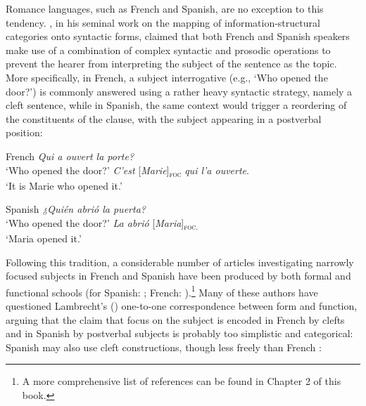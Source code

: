 Romance languages, such as French and Spanish, are no exception to this tendency. \textcite{lambrecht1996information}, in his seminal work on the mapping of information-structural categories onto syntactic forms, claimed that both French and Spanish speakers make use of a combination of complex syntactic and prosodic operations to prevent the hearer from interpreting the subject of the sentence as the topic. More specifically, in French, a subject interrogative (e.g., `Who opened the door?') is commonly answered using a rather heavy syntactic strategy, namely a cleft sentence, while in Spanish, the same context would trigger a reordering of the constituents of the clause, with the subject appearing in a postverbal position:

 \ea \label{ex:intro:2}  {French}
\ea \textit{Qui a ouvert la porte?}\\
 ‘Who opened the door?'
\ex \textit{C'est}  {[\textit{Marie}}]\textsubscript{\textsc{foc}} \normalsize  \textit{qui l'a ouverte}.\\
`It is Marie who opened it.'

\z \z 

 \ea \label{ex:intro:3} {Spanish}
\ea \textit{¿Quién abrió la puerta?}\\
 ‘Who opened the door?'
\ex \textit{La abrió} {[\textit{Maria}]\textsubscript{\textsc{foc.}}}\normalsize\\
`Maria opened it.'

\z \z 

Following this tradition, a considerable number of articles investigating narrowly focused subjects in French and Spanish have been produced by both formal and functional schools (for Spanish: \cite{zubizarreta1998prosody, costa2001postverbal, samek2001crosslinguistic, gutierrez2013structural, gabriel2007fokus, gabriel2010focus, heidinger2013information, uth2014spanish, cabrera1999funciones, feldhausen2015oraciones}; French: \cite{prince1978comparison, sornicola1988clefts, dufter2009focus, apotheloz2012pseudo, blanche1990franccais, roubaud2000constructions, fery2001focus, choi2005gens, lahousse2006, Lahousse2011, lahousse2012word, destruel2012french, karssenberg2017oiseaux, Karssenberg+2018}).\footnote{A more comprehensive list of references can be found in Chapter 2 of this book.} Many of these authors have questioned Lambrecht's (\citeyear{lambrecht1996information}) one-to-one correspondence between form and function, arguing that the claim that focus on the subject is encoded in French by clefts and in Spanish by postverbal subjects is probably too simplistic and categorical: Spanish may also use cleft constructions, though less freely than French \parencite{cabrera1999funciones, feldhausen2015oraciones}:

